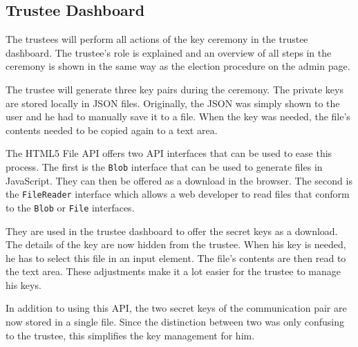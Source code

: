 \subsection{Trustee Dashboard}

The trustees will perform all actions of the key ceremony in the trustee dashboard. The trustee's role is explained and an overview of all steps in the ceremony is shown in the same way as the election procedure on the admin page.

\par The trustee will generate three key pairs during the ceremony. The private keys are stored locally in JSON files. Originally, the JSON was simply shown to the user and he had to manually save it to a file. When the key was needed, the file's contents needed to be copied again to a text area.

\par The HTML5 File API offers two API interfaces that can be used to ease this process.\cite{ranganathan_sicking_file_api} The first is the \texttt{Blob} interface that can be used to generate files in JavaScript. They can then be offered as a download in the browser. The second is the \texttt{FileReader} interface which allows a web developer to read files that conform to the \texttt{Blob} or \texttt{File} interfaces.

\par They are used in the trustee dashboard to offer the secret keys as a download. The details of the key are now hidden from the trustee. When his key is needed, he has to select this file in an input element. The file's contents are then read to the text area. These adjustments make it a lot easier for the trustee to manage his keys.

\par In addition to using this API, the two secret keys of the communication pair are now stored in a single file. Since the distinction between two was only confusing to the trustee, this simplifies the key management for him.
